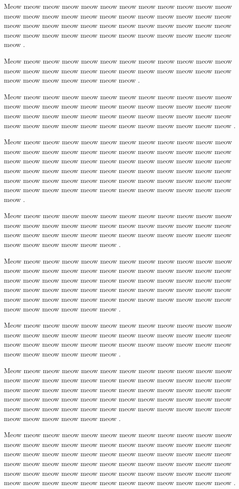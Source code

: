 \documentclass[12pt, a5paper, openany]{book}
\begin{document}
Meow meow meow meow meow meow meow meow meow meow meow meow meow meow meow meow meow meow meow meow meow meow meow meow meow meow meow meow meow meow meow meow meow meow meow meow meow meow meow meow meow meow meow meow meow meow meow meow meow .

Meow meow meow meow meow meow meow meow meow meow meow meow meow meow meow meow meow meow meow meow meow meow meow meow meow meow meow meow meow meow meow .

Meow meow meow meow meow meow meow meow meow meow meow meow meow meow meow meow meow meow meow meow meow meow meow meow meow meow meow meow meow meow meow meow meow meow meow meow meow meow meow meow meow meow meow meow meow meow meow meow .

Meow meow meow meow meow meow meow meow meow meow meow meow meow meow meow meow meow meow meow meow meow meow meow meow meow meow meow meow meow meow meow meow meow meow meow meow meow meow meow meow meow meow meow meow meow meow meow meow meow meow meow meow meow meow meow meow meow meow meow meow meow meow meow meow meow meow meow meow meow meow meow meow meow .

Meow meow meow meow meow meow meow meow meow meow meow meow meow meow meow meow meow meow meow meow meow meow meow meow meow meow meow meow meow meow meow meow meow meow meow meow meow meow meow meow meow meow .

Meow meow meow meow meow meow meow meow meow meow meow meow meow meow meow meow meow meow meow meow meow meow meow meow meow meow meow meow meow meow meow meow meow meow meow meow meow meow meow meow meow meow meow meow meow meow meow meow meow meow meow meow meow meow meow meow meow meow meow meow meow meow meow meow meow meow .

Meow meow meow meow meow meow meow meow meow meow meow meow meow meow meow meow meow meow meow meow meow meow meow meow meow meow meow meow meow meow meow meow meow meow meow meow meow meow meow meow meow meow .

Meow meow meow meow meow meow meow meow meow meow meow meow meow meow meow meow meow meow meow meow meow meow meow meow meow meow meow meow meow meow meow meow meow meow meow meow meow meow meow meow meow meow meow meow meow meow meow meow meow meow meow meow meow meow meow meow meow meow meow meow meow meow meow meow meow meow .

Meow meow meow meow meow meow meow meow meow meow meow meow meow meow meow meow meow meow meow meow meow meow meow meow meow meow meow meow meow meow meow meow meow meow meow meow meow meow meow meow meow meow meow meow meow meow meow meow meow meow meow meow meow meow meow meow meow meow meow meow meow meow meow meow meow meow meow meow meow meow meow meow .
\end{document}
